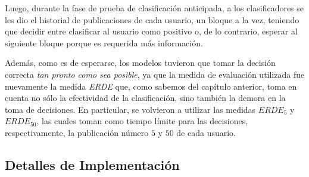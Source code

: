 Luego, durante la fase de prueba de clasificación anticipada, a los clasificadores se les dio el historial de publicaciones de cada usuario, un bloque a la vez, teniendo que decidir entre clasificar al usuario como positivo o, de lo contrario, esperar al siguiente bloque porque es requerida más información.

Además, como es de esperarse, los modelos tuvieron que tomar la decisión correcta \emph{tan pronto como sea posible}, ya que la medida de evaluación utilizada fue nuevamente la medida \emph{ERDE} que, como sabemos del capítulo anterior, toma en cuenta no sólo la efectividad de la clasificación, sino también la demora en la toma de decisiones.
En particular, se volvieron a utilizar las medidas $ERDE_5$ y $ERDE_{50}$, las cuales toman como tiempo límite para las decisiones, respectivamente, la publicación número $5$ y $50$ de cada usuario.


\subsection{Detalles de Implementación}
\label{sec:tss3-implementacion}



